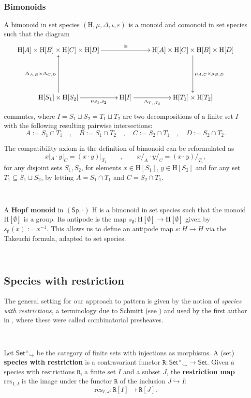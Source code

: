 \documentclass[12pt, reqno]{amsart}
\theoremstyle{definition}
\newcommand{\Fset}{\mathsf{Set^{\times}}}
\newcommand{\Set}{\mathsf{Set}}
\newcommand{\Ss}{\mathsf{Sp}} %
\newcommand{\rH}{\mathrm{H}}
\newcommand{\prR}{\mathtt{R}}
\begin{document}
\

\subsubsection{Bimonoids}
A bimonoid in set species $(\rH, \mu, \Delta, \iota, \varepsilon)$ is a monoid and comonoid in set species such that the diagram
\[\xymatrix{
\rH[A] \times \rH[B] \times\rH[C] \times \rH[D] \ar[rr]^-{\cong} && \rH[A] \times \rH[C] \times \rH[B] \times \rH[D] \ar[dd]^-{\mu_{A,C}\times\mu_{B,D}}\\
&&\\
\rH[S_1]\times \rH[S_2]\ar[uu]^-{\Delta_{A,B}\times \Delta_{C,D}} \ar[r]_-{\mu_{S_1, S_2}} & \rH[I] \ar[r]_-{\Delta_{T_1, T_2}} & \rH[T_1]\times \rH[T_2]
}\]
commutes, where $I=S_1\sqcup S_2=T_1 \sqcup T_2$ are two decompositions of a finite set $I$ with the following resulting pairwise intersections:
\[A:=S_1\cap T_1 \quad , \quad B:=S_1 \cap T_2 \quad , \quad C:=S_2 \cap T_1 \quad , \quad D:=S_2 \cap T_2.\]

The compatibility axiom in the definition of bimonoid can be reformulated as
\[x|_A \cdot y|_C= (x\cdot y)|_{T_1} \qquad , \qquad x/_A \cdot y/_C=(x \cdot y)/_{T_1},\]
for any disjoint sets $S_1, S_2$, for elements $x \in \rH[S_1]$, $y\in \rH[S_2]$ and for any set $T_1\subseteq S_1 \sqcup S_2$, by letting $A= S_1 \cap T_1$ and $C= S_2\cap T_1$.

\

A {\bf Hopf monoid} in $(\Ss, \cdot)$ $\rH$ is a bimonoid in set species such that the monoid $\rH[\emptyset]$ is a group. Its antipode is the map $s_\emptyset: \rH[\emptyset]\to \rH[\emptyset]$ given by $s_\emptyset(x):=x^{-1}$.
This allows us to define an antipode map $s: H\to H$ via the Takeuchi formula, adapted to set species.

\

\subsection{Species with restriction}
The general setting for our approach to pattern is given by the notion of \emph{species with restrictions}, a terminology due to Schmitt (see \cite{Schmitt1993}) and used by the first author in \cite{Penaguiao2020}, where these were called combinatorial presheaves.

\

Let $\Fset_{\!\!\!\!\!\hookrightarrow}$ be the category of finite sets with injections as morphisms. A (set) {\bf species with restriction} is a contravariant functor $\prR:\Fset_{\!\!\!\!\!\hookrightarrow} \to \Set$. Given a species with restrictions $\prR$, a finite set $I$ and a subset $J$, the {\bf restriction map} $\text{res}_{I,J}$ is the image under the functor $\prR$ of the inclusion $J \hookrightarrow I$:
\[\text{res}_{I,J}: \prR[I]\to \prR[J].\]
\end{document}
